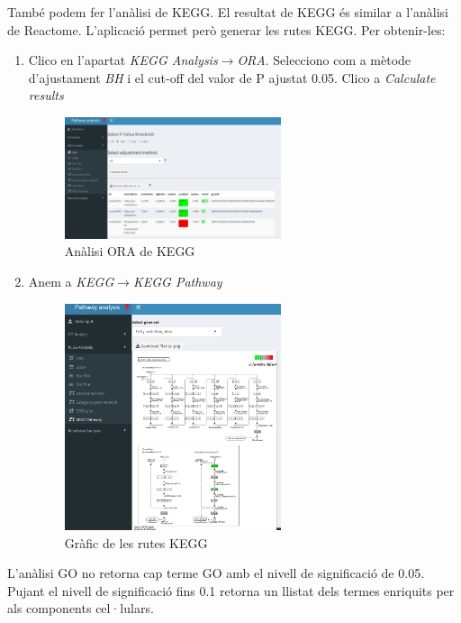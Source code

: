També podem fer l'anàlisi de KEGG. El resultat de KEGG és similar a l'anàlisi de Reactome. L'aplicació permet però generar les rutes KEGG. Per obtenir-les:

\begin{enumerate}
\item Clico en l'apartat \textit{KEGG Analysis}$\rightarrow$\textit{ORA}. Selecciono com a mètode d'ajustament \textit{BH} i el cut-off del valor de P ajustat 0.05. Clico a \textit{Calculate results}
\begin{figure}[H]
\centering
\includegraphics[width=0.6\textwidth]{figures/Estudi1_Fig11_ORA_KEGG.png} 
\caption{Anàlisi ORA de KEGG}
\end{figure}

\item Anem a \textit{KEGG}$\rightarrow$\textit{KEGG Pathway}
\begin{figure}[H]
\centering
\includegraphics[width=0.6\textwidth]{figures/Estudi1_Fig12_KEGG_Pathway.png} 
\caption{Gràfic de les rutes KEGG}
\end{figure}
\end{enumerate}

L'anàlisi GO no retorna cap terme GO amb el nivell de significació de 0.05. Pujant el nivell de significació fins 0.1 retorna un llistat dels termes enriquits per als components cel·lulars.

